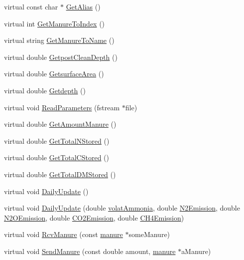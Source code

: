 \begin{DoxyCompactItemize}
\item 
virtual const char $\ast$ \hyperlink{classmanurestore_abda404dea9d79e860e6ee86205c15114}{GetAlias} ()
\item 
virtual int \hyperlink{classmanurestore_a52c5f463ee4ec47a1972d23760805a16}{GetManureToIndex} ()
\item 
virtual string \hyperlink{classmanurestore_a5758b07658698cd9db4d0df2d6fa9a69}{GetManureToName} ()
\item 
virtual double \hyperlink{classmanurestore_a66e29b13faa30e08dc88df6ab7c561ad}{GetpostCleanDepth} ()
\item 
virtual double \hyperlink{classmanurestore_a7ddb69d1eb35b7d98fb9c301e24b1c8b}{GetsurfaceArea} ()
\item 
virtual double \hyperlink{classmanurestore_a40d306f5e212c2fd0a2163afdf5325ce}{Getdepth} ()
\item 
virtual void \hyperlink{classmanurestore_ae639f0ef3e9fee3416a2bfd2ab1ef496}{ReadParameters} (fstream $\ast$file)
\item 
virtual double \hyperlink{classmanurestore_a7f6972189e8c5c44887abaaad7b563ae}{GetAmountManure} ()
\item 
virtual double \hyperlink{classmanurestore_ac6e20f11b514cdf0794ea7d7cddcb438}{GetTotalNStored} ()
\item 
virtual double \hyperlink{classmanurestore_a1594e166fa24b3c783dd902f8e4d78bb}{GetTotalCStored} ()
\item 
virtual double \hyperlink{classmanurestore_a1c140a30a254928321fcbe43b7f15955}{GetTotalDMStored} ()
\item 
virtual void \hyperlink{classmanurestore_a6eb8d6bedf9b0732423bfbb98d5da453}{DailyUpdate} ()
\item 
virtual void \hyperlink{classmanurestore_a9305e9ead062b785f642bc3a8a5130d3}{DailyUpdate} (double \hyperlink{classmanurestore_ac9d398e432684fb02bfaf52c2f0e9ae8}{volatAmmonia}, double \hyperlink{classmanurestore_a9a8d525f55145b43f2ab275fb9b5f35f}{N2Emission}, double \hyperlink{classmanurestore_aca5ad359219f1f6c9a957f03156136ab}{N2OEmission}, double \hyperlink{classmanurestore_aebc6ae97114292e973c57cbc2ecc4f84}{CO2Emission}, double \hyperlink{classmanurestore_ae472072caaaea49932fe2152e6a4fb09}{CH4Emission})
\item 
virtual void \hyperlink{classmanurestore_ab32685c2f4be9bb58269655cab7c96ee}{RcvManure} (const \hyperlink{classmanure}{manure} $\ast$someManure)
\item 
virtual void \hyperlink{classmanurestore_a806191a8259f6b81782af3fe3cb0301f}{SendManure} (const double amount, \hyperlink{classmanure}{manure} $\ast$aManure)

\end{DoxyCompactItemize}
